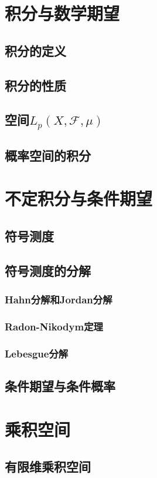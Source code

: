 
\chapter{积分与数学期望}
\section{积分的定义}
\section{积分的性质}
\section{空间$L_p(X,\mathscr{F},\mu)$}
\section{概率空间的积分}


\chapter{不定积分与条件期望}
\section{符号测度}
\section{符号测度的分解}
	\subsection{Hahn分解和Jordan分解}
	\subsection{Radon-Nikodym定理}
	\subsection{Lebesgue分解}
\section{条件期望与条件概率}

\chapter{乘积空间}
\section{有限维乘积空间}
